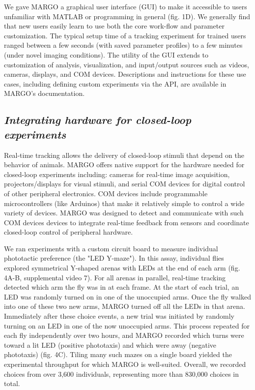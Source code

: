 \documentclass[10pt,letterpaper]{article}
\begin{document}
We gave MARGO a graphical user interface (GUI) to make it accessible to users unfamiliar with MATLAB or programming in general (fig. 1D). We generally find that new users easily learn to use both the core work-flow and parameter customization. The typical setup time of a tracking experiment for trained users ranged between a few seconds (with saved parameter profiles) to a few minutes (under novel imaging conditions). The utility of the GUI extends to customization of analysis, visualization, and input/output sources such as videos, cameras, displays, and COM devices. Descriptions and instructions for these use cases, including defining custom experiments via the API, are available in MARGO's documentation.

\subsection*{\textit{Integrating hardware for closed-loop experiments}}

Real-time tracking allows the delivery of closed-loop stimuli that depend on the behavior of animals. MARGO offers native support for the hardware needed for closed-loop experiments including: cameras for real-time image acquisition, projectors/displays for visual stimuli, and serial COM devices for digital control of other peripheral electronics. COM devices include programmable microcontrollers (like Arduinos) that make it relatively simple to control a wide variety of devices. MARGO was designed to detect and communicate with such COM devices devices to integrate real-time feedback from sensors and coordinate closed-loop control of peripheral hardware. 

We ran experiments with a custom circuit board to measure individual phototactic preference (the "LED Y-maze"). In this assay, individual flies explored symmetrical Y-shaped arenas with LEDs at the end of each arm (fig. 4A-B, supplemental video 7). For all arenas in parallel, real-time tracking detected which arm the fly was in at each frame. At the start of each trial, an LED was randomly turned on in one of the unoccupied arms. Once the fly walked into one of these two new arms, MARGO turned off all the LEDs in that arena. Immediately after these choice events, a new trial was initiated by randomly turning on an LED in one of the now unoccupied arms. This process repeated for each fly independently over two hours, and MARGO recorded which turns were toward a lit LED (positive phototaxis) and which were away (negative phototaxis) (fig. 4C). Tiling many such mazes on a single board yielded the experimental throughput for which MARGO is well-suited. Overall, we recorded choices from over 3,600 individuals, representing more than 830,000 choices in total.
\end{document}
